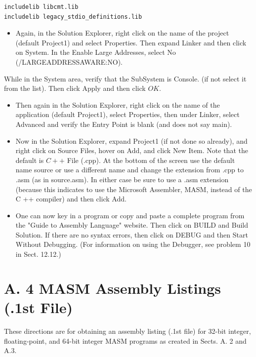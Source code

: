 \documentclass[10pt]{article}
\begin{document}
\begin{verbatim}
includelib libcmt.lib
includelib legacy_stdio_definitions.lib
\end{verbatim}

\begin{itemize}
  \item Again, in the Solution Explorer, right click on the name of the project (default Project1) and select Properties. Then expand Linker and then click on System. In the Enable Large Addresses, select No (/LARGEADDRESSAWARE:NO).
\end{itemize}

While in the System area, verify that the SubSystem is Console. (if not select it from the list). Then click Apply and then click $O K$.

\begin{itemize}
  \item Then again in the Solution Explorer, right click on the name of the application (default Project1), select Properties, then under Linker, select Advanced and verify the Entry Point is blank (and does not say main).
  \item Now in the Solution Explorer, expand Project1 (if not done so already), and right click on Source Files, hover on Add, and click New Item. Note that the default is $C++$ File (.cpp). At the bottom of the screen use the default name source or use a different name and change the extension from .cpp to .asm (as in source.asm). In either case be sure to use a .asm extension (because this indicates to use the Microsoft Assembler, MASM, instead of the C ++ compiler) and then click Add.
  \item One can now key in a program or copy and paste a complete program from the "Guide to Assembly Language" website. Then click on BUILD and Build Solution. If there are no syntax errors, then click on DEBUG and then Start Without Debugging. (For information on using the Debugger, see problem 10 in Sect. 12.12.)
\end{itemize}

\section*{A. 4 MASM Assembly Listings (.1st File)}
These directions are for obtaining an assembly listing (.1st file) for 32-bit integer, floating-point, and 64-bit integer MASM programs as created in Sects. A. 2 and A.3.
\end{document}
